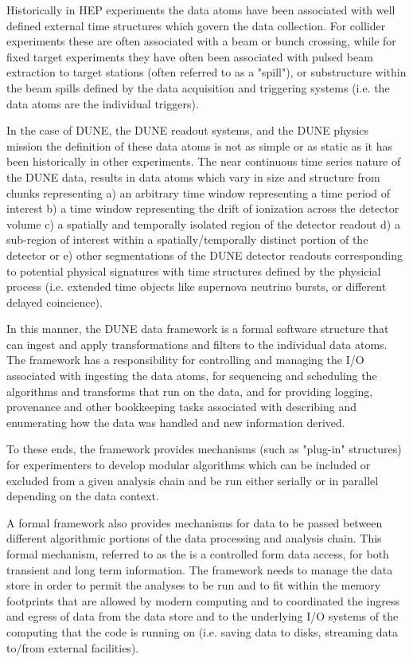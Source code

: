 \documentclass[../main-v1.tex]{subfiles}
\begin{document}
Historically in HEP experiments the data atoms have been associated with well defined external time structures which govern the data collection.  For collider experiments these are often associated with a beam or bunch crossing, while for fixed target experiments they have often been associated with pulsed beam extraction to target stations (often referred to as a "spill"), or substructure within the beam spills defined by the data acquisition and triggering systems (i.e. the data atoms are the individual triggers).  

In the case of DUNE, the DUNE readout systems, and the DUNE physics mission the definition of these data atoms is not as simple or as static as it has been historically in other experiments.  The near continuous time series nature of the DUNE data, results in data atoms which vary in size and structure from chunks representing a) an arbitrary time window representing a time period of interest b) a time window representing the drift of ionization across the detector volume c) a spatially and temporally isolated region of the detector readout d) a sub-region of interest within a spatially/temporally distinct portion of the detector or e) other segmentations of the DUNE detector readouts corresponding to potential physical signatures with time structures defined by the physicial process (i.e. extended time objects like supernova neutrino bursts, or different delayed coincience).

In this manner, the DUNE data framework is a formal software structure that can ingest and apply transformations and filters to the individual data atoms.  The framework has a responsibility for controlling and managing the I/O associated with ingesting the data atoms, for sequencing and scheduling the algorithms and transforms that run on the data, and for providing logging, provenance and other bookkeeping tasks associated with describing and enumerating how the data was handled and new information derived.  

To these ends, the framework provides mechanisms (such as "plug-in" structures) for experimenters to develop modular algorithms which can be included or excluded from a given analysis chain and be run either serially or in parallel depending on the data context. 

A formal framework also provides mechanisms for data to be passed between different algorithmic portions of the data processing and analysis chain.  This formal mechanism, referred to as the  is a controlled form data access, for both transient and long term information.  The framework needs to manage the data store in order to permit the analyses to be run and to fit within the memory footprints that are allowed by modern computing and to coordinated the ingress and egress of data from the data store and to the underlying I/O systems of the computing that the code is running on (i.e. saving data to disks, streaming data to/from external facilities). 
\end{document}
